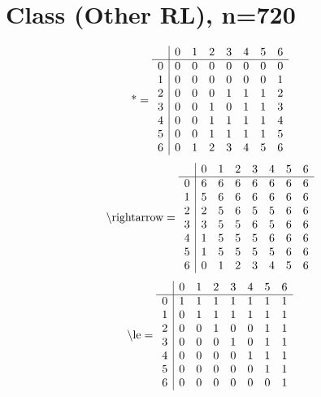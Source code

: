 \documentclass[11pt]{article}
\begin{document}
\section{Class (Other RL), n=720}
\[\text{*} = 
\begin{array}{r | r r r r r r r}
 & 0 & 1 & 2 & 3 & 4 & 5 & 6 \\ \hline
0 & 0 & 0 & 0 & 0 & 0 & 0 & 0 \\
1 & 0 & 0 & 0 & 0 & 0 & 0 & 1 \\
2 & 0 & 0 & 0 & 1 & 1 & 1 & 2 \\
3 & 0 & 0 & 1 & 0 & 1 & 1 & 3 \\
4 & 0 & 0 & 1 & 1 & 1 & 1 & 4 \\
5 & 0 & 0 & 1 & 1 & 1 & 1 & 5 \\
6 & 0 & 1 & 2 & 3 & 4 & 5 & 6 \\
\end{array}
\]
\[\text{\textbackslash rightarrow} = 
\begin{array}{r | r r r r r r r}
 & 0 & 1 & 2 & 3 & 4 & 5 & 6 \\ \hline
0 & 6 & 6 & 6 & 6 & 6 & 6 & 6 \\
1 & 5 & 6 & 6 & 6 & 6 & 6 & 6 \\
2 & 2 & 5 & 6 & 5 & 5 & 6 & 6 \\
3 & 3 & 5 & 5 & 6 & 5 & 6 & 6 \\
4 & 1 & 5 & 5 & 5 & 6 & 6 & 6 \\
5 & 1 & 5 & 5 & 5 & 5 & 6 & 6 \\
6 & 0 & 1 & 2 & 3 & 4 & 5 & 6 \\
\end{array}
\]
\[\text{\textbackslash le} = 
\begin{array}{r | r r r r r r r}
 & 0 & 1 & 2 & 3 & 4 & 5 & 6 \\ \hline
0 & 1 & 1 & 1 & 1 & 1 & 1 & 1 \\
1 & 0 & 1 & 1 & 1 & 1 & 1 & 1 \\
2 & 0 & 0 & 1 & 0 & 0 & 1 & 1 \\
3 & 0 & 0 & 0 & 1 & 0 & 1 & 1 \\
4 & 0 & 0 & 0 & 0 & 1 & 1 & 1 \\
5 & 0 & 0 & 0 & 0 & 0 & 1 & 1 \\
6 & 0 & 0 & 0 & 0 & 0 & 0 & 1 \\
\end{array}
\]
\end{document}

